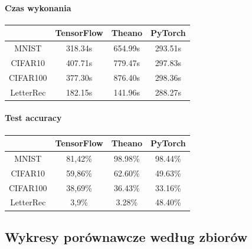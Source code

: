 \documentclass[a4paper,11pt]{article}
\begin{document}
\paragraph{Czas wykonania}
\begin{tabular}{|c|c|c|c|}
\hline &TensorFlow & Theano & PyTorch \\ 
\hline MNIST &318.34s &654.99s  &293.51s  \\ 
\hline CIFAR10 &407.71s &779.47s  &297.83s  \\ 
\hline CIFAR100 &377.30s &876.40s  &298.36s  \\ 
\hline LetterRec &182.15s &141.96s  &288.27s  \\ 
\hline
\end{tabular}
\paragraph{Test accuracy}
\begin{tabular}{|c|c|c|c|}
\hline &TensorFlow & Theano & PyTorch \\ 
\hline MNIST &81,42\% &98.98\%  &98.44\%  \\ 
\hline CIFAR10 &59,86\%  &62.60\%  &49.63\%  \\ 
\hline CIFAR100 &38,69\% &36.43\%  &33.16\%  \\ 
\hline LetterRec &3,9\% &3.28\%  &48.40\%  \\ 
\hline
\end{tabular}
\newpage
\subsection{Wykresy porównawcze według zbiorów} 
\end{document}
